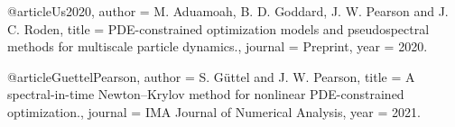 

@article{Us2020,
	author = {M. Aduamoah, B. D. Goddard, J. W. Pearson and J. C. Roden},
	title = {PDE-constrained optimization models and pseudospectral methods for multiscale particle dynamics.},
	journal = {Preprint},
	year = {2020}.
}

@article{GuettelPearson,
	author = {S. Güttel and J. W. Pearson},
	title = {A spectral-in-time Newton–Krylov method for nonlinear PDE-constrained optimization.},
	journal = {IMA Journal of Numerical Analysis},
	year = {2021}.
}
	
	
	
